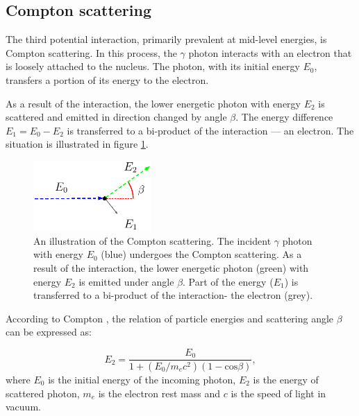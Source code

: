 \subsection{Compton scattering}
The third potential interaction, primarily prevalent at mid-level energies, is Compton scattering.
In this process, the $\gamma$ photon interacts with an electron that is loosely attached to the nucleus. 
The photon, with its initial energy $E_{0}$, transfers a portion of its energy to the electron.



As a result of the interaction, the lower energetic photon with energy $E_{2}$ is scattered and emitted in direction changed by angle $\beta$. 
The energy difference $E_{1} = E_{0} - E_{2}$ is transferred to a bi-product of the interaction --- an electron.
The situation is illustrated in figure \ref{fig:scattering}.

\begin{figure}[!h]
    \centering
    \includegraphics[width=0.4\textwidth]{./fig/photos/compton_simple2.eps}
    \caption{An illustration of the Compton scattering. The incident $\gamma$ photon with energy $E_{0}$ (blue) undergoes the Compton scattering. As a result of the interaction, the lower energetic photon (green) with energy $E_{2}$ is emitted under angle $\beta$. Part of the energy ($E_{1}$) is transferred to a bi-product of the interaction- the electron (grey).}
    \label{fig:scattering}
\end{figure}

According to Compton \cite{compton}, the relation of particle energies and scattering angle $\beta$ can be expressed as:

\begin{equation}
E_{2} = \frac{E_{0}}{  1 + (E_{0} / m_{e}c^{2}) (1 - \mathrm{cos} \beta)},
  \label{eq:compton_energies}
\end{equation}
where $E_{0}$ is the initial energy of the incoming photon, $E_{2}$ is the energy of scattered photon,  $m_{e}$ is the electron rest mass and $c$ is the speed of light in vacuum. 
\mycomment{ %
  The probability that a photon with an energy $E_{0}$ undergoes a Compton scattering through an angle $\beta$ is described by the Klein-Nishina formula
  \begin{equation}
    K(\beta, E_{0}) = \frac{r_{e}^{2}}{2} \left( \frac{E_{2}}{E_{0}}  \right)^{2} \left(  \frac{E_{2}}{E_{0}} + \frac{E_{0}}{E_{2}} - \mathrm{sin}^{2}(\beta)  \right),
    \label{eq:klein_nishina}
  \end{equation}
  where $r_{e}$ is the classical electron radius. 
}%

